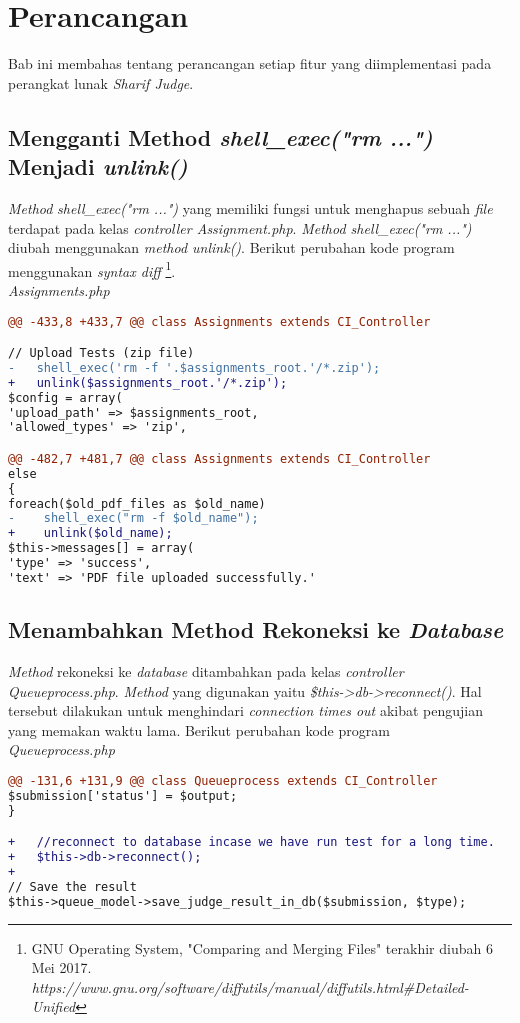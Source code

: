 \chapter{Perancangan}
\label{chap:perancangan}

Bab ini membahas tentang perancangan setiap fitur yang diimplementasi pada perangkat lunak \textit{Sharif Judge}. 

\section{Mengganti Method \textit{shell\_exec("rm ...")} Menjadi \textit{unlink()}}
\textit{Method} \textit{shell\_exec("rm ...")} yang memiliki fungsi untuk menghapus sebuah \textit{file} terdapat pada kelas \textit{controller Assignment.php}. \textit{Method shell\_exec("rm ...")} diubah menggunakan \textit{method unlink()}. Berikut perubahan kode program menggunakan \textit{syntax diff} \footnote{GNU Operating System, "Comparing and Merging Files" terakhir diubah 6 Mei 2017. \textit{https://www.gnu.org/software/diffutils/manual/diffutils.html\#Detailed-Unified}}.
~\\
\textit{Assignments.php}
\begin{lstlisting}[language=diff, basicstyle=\ttfamily, frame=single,
columns=fullflexible, keepspaces=true]
@@ -433,8 +433,7 @@ class Assignments extends CI_Controller

// Upload Tests (zip file)
-   shell_exec('rm -f '.$assignments_root.'/*.zip');
+   unlink($assignments_root.'/*.zip');
$config = array(
'upload_path' => $assignments_root,
'allowed_types' => 'zip',

@@ -482,7 +481,7 @@ class Assignments extends CI_Controller
else
{
foreach($old_pdf_files as $old_name)
-    shell_exec("rm -f $old_name");
+    unlink($old_name);
$this->messages[] = array(
'type' => 'success',
'text' => 'PDF file uploaded successfully.'
\end{lstlisting}

\section{Menambahkan Method Rekoneksi ke \textit{Database}}
\textit{Method} rekoneksi ke \textit{database} ditambahkan pada kelas \textit{controller Queueprocess.php}. \textit{Method} yang digunakan yaitu \textit{\$this->db->reconnect()}. %
Hal tersebut dilakukan untuk menghindari \textit{connection times out} akibat pengujian yang memakan waktu lama.
Berikut perubahan kode program
~\\
\textit{Queueprocess.php}
\begin{lstlisting}[language=diff, basicstyle=\ttfamily, frame=single,
columns=fullflexible, keepspaces=true]
@@ -131,6 +131,9 @@ class Queueprocess extends CI_Controller
$submission['status'] = $output;
}

+   //reconnect to database incase we have run test for a long time.
+   $this->db->reconnect();
+
// Save the result
$this->queue_model->save_judge_result_in_db($submission, $type);
\end{lstlisting}


